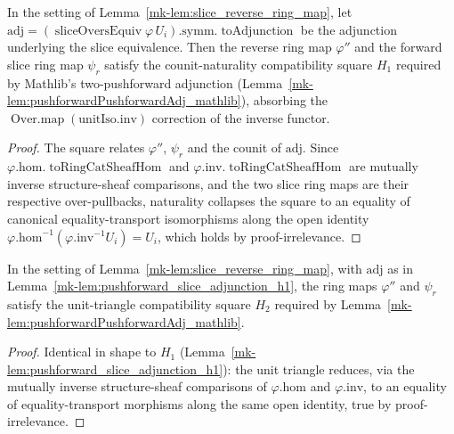 \begin{lemma}\label{mk-lem:pushforward_slice_adjunction_h1}
  \leanok

  In the setting of Lemma~\ref{mk-lem:slice_reverse_ring_map}, let \(\mathrm{adj} =
  (\operatorname{sliceOversEquiv}\varphi\,U_i).\mathrm{symm}.\operatorname{toAdjunction}\) be the
  adjunction underlying the slice equivalence. Then the reverse ring map \(\varphi''\) and the forward
  slice ring map \(\psi_r\) satisfy the counit-naturality compatibility square \(H_1\) required by
  Mathlib's two-pushforward adjunction (Lemma~\ref{mk-lem:pushforwardPushforwardAdj_mathlib}), absorbing
  the \(\operatorname{Over.map}(\mathrm{unitIso}.\mathrm{inv})\) correction of the inverse functor.
\end{lemma}
\begin{proof}
  \leanok
  The square relates \(\varphi''\), \(\psi_r\) and the counit of \(\mathrm{adj}\). Since
  \(\varphi.\mathrm{hom}.\operatorname{toRingCatSheafHom}\) and
  \(\varphi.\mathrm{inv}.\operatorname{toRingCatSheafHom}\) are mutually inverse structure-sheaf
  comparisons, and the two slice ring maps are their respective over-pullbacks, naturality collapses the
  square to an equality of canonical equality-transport isomorphisms along the open identity
  \(\varphi.\mathrm{hom}^{-1}(\varphi.\mathrm{inv}^{-1} U_i) = U_i\), which holds by
  proof-irrelevance.
\end{proof}

\begin{lemma}\label{mk-lem:pushforward_slice_adjunction_h2}
  \leanok

  In the setting of Lemma~\ref{mk-lem:slice_reverse_ring_map}, with \(\mathrm{adj}\) as in
  Lemma~\ref{mk-lem:pushforward_slice_adjunction_h1}, the ring maps \(\varphi''\) and \(\psi_r\) satisfy
  the unit-triangle compatibility square \(H_2\) required by
  Lemma~\ref{mk-lem:pushforwardPushforwardAdj_mathlib}.
\end{lemma}
\begin{proof}
  \leanok
  Identical in shape to \(H_1\) (Lemma~\ref{mk-lem:pushforward_slice_adjunction_h1}): the unit triangle
  reduces, via the mutually inverse structure-sheaf comparisons of \(\varphi.\mathrm{hom}\) and
  \(\varphi.\mathrm{inv}\), to an equality of equality-transport morphisms along the same open identity,
  true by proof-irrelevance.
\end{proof}


